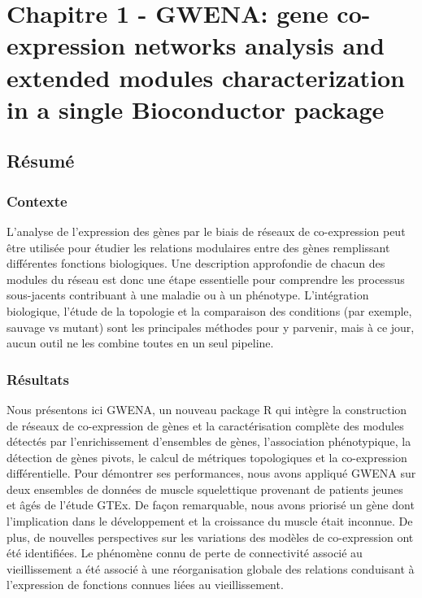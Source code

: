 \chapter{Chapitre 1 - GWENA: gene co-expression networks analysis and extended modules characterization in a single Bioconductor package}
\label{chapter:gwena}


\section{Résumé}

\subsection{Contexte}
L'analyse de l'expression des gènes par le biais de réseaux de co-expression peut être utilisée pour étudier les relations modulaires entre des gènes remplissant différentes fonctions biologiques. Une description approfondie de chacun des modules du réseau est donc une étape essentielle pour comprendre les processus sous-jacents contribuant à une maladie ou à un phénotype. L'intégration biologique, l'étude de la topologie et la comparaison des conditions (par exemple, sauvage vs mutant) sont les principales méthodes pour y parvenir, mais à ce jour, aucun outil ne les combine toutes en un seul pipeline.

\subsection{Résultats}
Nous présentons ici GWENA, un nouveau package R qui intègre la construction de réseaux de co-expression de gènes et la caractérisation complète des modules détectés par l'enrichissement d'ensembles de gènes, l'association phénotypique, la détection de gènes pivots, le calcul de métriques topologiques et la co-expression différentielle. Pour démontrer ses performances, nous avons appliqué GWENA sur deux ensembles de données de muscle squelettique provenant de patients jeunes et âgés de l'étude GTEx. De façon remarquable, nous avons priorisé un gène dont l'implication dans le développement et la croissance du muscle était inconnue. De plus, de nouvelles perspectives sur les variations des modèles de co-expression ont été identifiées. Le phénomène connu de perte de connectivité associé au vieillissement a été associé à une réorganisation globale des relations conduisant à l'expression de fonctions connues liées au vieillissement.

